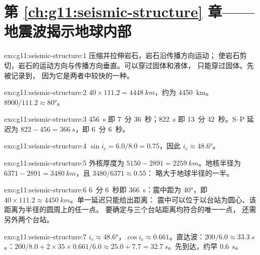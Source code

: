 \section*{第 \ref{ch:g11:seismic-structure} 章——地震波揭示地球内部}

\begin{solution}{exo:g11:seismic-structure:1}
压缩并拉伸岩石，岩石沿传播方向运动；
使岩石剪切，岩石的运动方向与传播方向垂直。可以穿过固体和液体，
只能穿过固体。先被记录到，
因为它是两者中较快的一种。
\end{solution}

\begin{solution}{exo:g11:seismic-structure:2}
$40 \times 111.2 = \qty{4448}{km}$，约为 \qty{4450}{km}。$8900/111.2
\approx \ang{80}$。
\end{solution}

\begin{solution}{exo:g11:seismic-structure:3}
\qty{456}{s} 即 7~分 36~秒；\qty{822}{s} 即 13~分
42~秒。S--P 延迟为 $822 - 456 = \qty{366}{s}$，即 6~分
6~秒。
\end{solution}

\begin{solution}{exo:g11:seismic-structure:4}
$\sin i_c = 6.0/8.0 = 0.75$，因此 $i_c \approx \ang{48.6}$。
\end{solution}

\begin{solution}{exo:g11:seismic-structure:5}
外核厚度为 $5150 - 2891 = \qty{2259}{km}$。地核半径为
$6371 - 2891 = \qty{3480}{km}$，且 $3480/6371 \approx 0.55$：
略大于地球半径的一半。
\end{solution}

\begin{solution}{exo:g11:seismic-structure:6}
6~分 6~秒即 \qty{366}{s}：震中距为 \ang{40}，即
$40 \times 111.2 \approx \qty{4450}{km}$。单一延迟只能给出距离：
震中可以位于以台站为圆心、该距离为半径的圆周上的任一点。
要确定与三个台站距离均符合的唯一一点，
还需另外两个台站。
\end{solution}

\begin{solution}{exo:g11:seismic-structure:7}
$i_c \approx \ang{48.6}$，$\cos i_c \approx 0.661$。直达波：$200/6.0
\approx \qty{33.3}{s}$。：$200/8.0 + 2 \times 35 \times 0.661/6.0
\approx 25.0 + 7.7 = \qty{32.7}{s}$。先到达，约早
\qty{0.6}{s}。
\end{solution}

